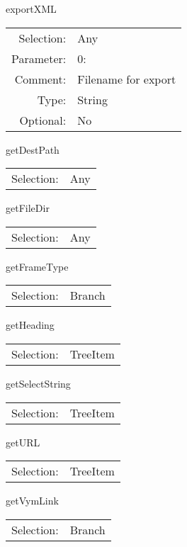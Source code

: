 \item exportXML\\
\begin{tabular}{rl}
  Selection: & Any\\
   Parameter: &  0:\\
        Comment: & Filename for export\\
           Type: & String\\
       Optional: &  No\\
\end{tabular}

\item getDestPath\\
\begin{tabular}{rl}
  Selection: & Any\\
\end{tabular}

\item getFileDir\\
\begin{tabular}{rl}
  Selection: & Any\\
\end{tabular}

\item getFrameType\\
\begin{tabular}{rl}
  Selection: & Branch\\
\end{tabular}

\item getHeading\\
\begin{tabular}{rl}
  Selection: & TreeItem\\
\end{tabular}

\item getSelectString\\
\begin{tabular}{rl}
  Selection: & TreeItem\\
\end{tabular}

\item getURL\\
\begin{tabular}{rl}
  Selection: & TreeItem\\
\end{tabular}

\item getVymLink\\
\begin{tabular}{rl}
  Selection: & Branch\\
\end{tabular}

